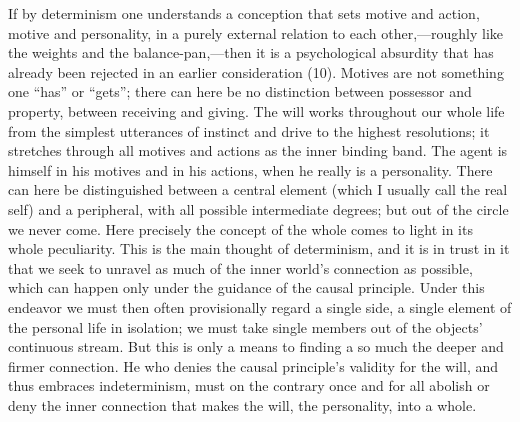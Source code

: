 \documentclass[12pt,a4paper]{book}
\newcommand{\opage}[1]{\marginnote{\footnotesize\textit{[#1]}}}
\begin{document}
If by determinism one understands a conception that sets motive and action, motive
and personality, in a purely external relation to each other,---roughly like the
weights and the balance-pan,---then it is a psychological absurdity that has already
been rejected in an earlier consideration (10). Motives are not something one
``has'' or ``gets''; there can here be no distinction between possessor and property,
between receiving and giving. The will works throughout our whole life from the
simplest utterances of instinct and drive to the highest resolutions; it stretches
through all motives and actions as the inner binding band. The agent is \opage{292}himself in
his motives and in his actions, when he really is a personality. There can here be
distinguished between a central element (which I usually call the real self) and a
peripheral, with all possible intermediate degrees; but out of the circle we never
come. Here precisely the concept of the whole comes to light in its whole
peculiarity. This is the main thought of determinism, and it is in trust in it that
we seek to unravel as much of the inner world's connection as possible, which can happen only under the guidance of the causal principle. Under this endeavor we must then
often provisionally regard a single side, a single element of the personal life in
isolation; we must take single members out of the objects' continuous stream. But
this is only a means to finding a so much the deeper and firmer connection. He who
denies the causal principle's validity for the will, and thus embraces indeterminism,
must on the contrary once and for all abolish or deny the inner connection that makes
the will, the personality, into a whole.
\end{document}
